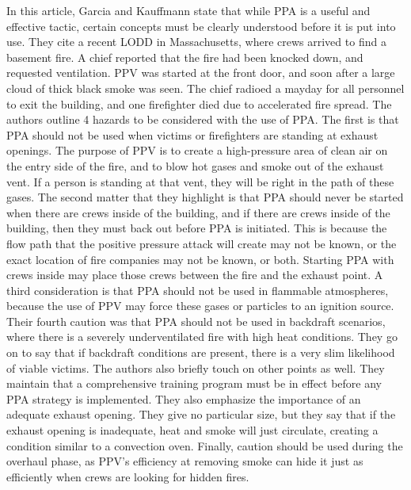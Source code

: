 \documentclass{article}
\begin{document}
\begin{appendices}
In this article, Garcia and Kauffmann state that while PPA is a useful and effective tactic, certain concepts must be clearly understood before it is put into use. They cite a recent LODD in Massachusetts, where crews arrived to find a basement fire. A chief reported that the fire had been knocked down, and requested ventilation. PPV was started at the front door, and soon after a large cloud of thick black smoke was seen. The chief radioed a mayday for all personnel to exit the building, and one firefighter died due to accelerated fire spread. The authors outline 4 hazards to be considered with the use of PPA. The first is that PPA should not be used when victims or firefighters are standing at exhaust openings. The purpose of PPV is to create a high-pressure area of clean air on the entry side of the fire, and to blow hot gases and smoke out of the exhaust vent. If a person is standing at that vent, they will be right in the path of these gases. The second matter that they highlight is that PPA should never be started when there are crews inside of the building, and if there are crews inside of the building, then they must back out before PPA is initiated. This is because the flow path that the positive pressure attack will create may not be known, or the exact location of fire companies may not be known, or both. Starting PPA with crews inside may place those crews between the fire and the exhaust point. A third consideration is that PPA should not be used in flammable atmospheres, because the use of PPV may force these gases or particles to an ignition source. Their fourth caution was that PPA should not be used in backdraft scenarios, where there is a severely underventilated fire with high heat conditions. They go on to say that if backdraft conditions are present, there is a very slim likelihood of viable victims. The authors also briefly touch on other points as well. They maintain that a comprehensive training program must be in effect before any PPA strategy is implemented. They also emphasize the importance of an adequate exhaust opening. They give no particular size, but they say that if the exhaust opening is inadequate, heat and smoke will just circulate, creating a condition similar to a convection oven. Finally, caution should be used during the overhaul phase, as PPV’s efficiency at removing smoke can hide it just as efficiently when crews are looking for hidden fires.\cite{GarciaPPVatStructures}


\end{appendices}
\end{document}

